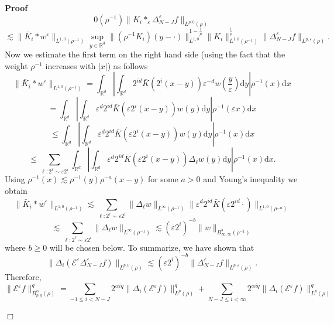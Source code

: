 \documentclass[a4paper,11pt]{article}
\newcommand{\cdummy}{\cdot}
\newcommand{\mathd}{\mathrm{d}}
\newenvironment{proof}{\noindent\textbf{Proof\ }}{\hspace*{\fill}$\Box$\medskip}
\numberwithin{equation}{section}
\begin{document}
\begin{proof}
\[{{     0} (\rho^{- 1})} \| K_i \ast_{\varepsilon} \Delta^{\varepsilon}_{N - J} f
     \|_{L^{p, 0} (\rho)} \]
  \[ \lesssim \| \bar{K}_i \ast w^{\varepsilon} \|_{L^{1, 0} (\rho^{- 1})}
     \sup_{y \in \mathbb{R}^d} \| (\rho^{- 1} K_i) (y - \cdummy) \|^{1 -
     \frac{1}{p}}_{L^{1, 0}} \| K_i \|^{\frac{1}{p}}_{L^{1, 0} (\rho^{- 1})}
     \| \Delta^{\varepsilon}_{N - J} f \|_{L^{p, \varepsilon} (\rho)} . \]
  Now we estimate the first term on the right hand side (using the fact that the weight $\rho^{-1}$  increases with $|x|$) as follows
  \[ \| \bar{K}_i \ast w^{\varepsilon} \|_{L^{1, 0} (\rho^{- 1})} =
     \int_{\mathbb{R}^d} \left| \int_{\mathbb{R}^d} 2^{i d} \bar{K} (2^i (x -
     y)) \varepsilon^{- d} w \left( \frac{y}{\varepsilon} \right) \mathd y
     \right| \rho^{- 1} (x) \mathd x \]
  \[ = \int_{\mathbb{R}^d} \left| \int_{\mathbb{R}^d} \varepsilon^d 2^{i d}
     \bar{K} (\varepsilon 2^i (x - y)) w (y) \mathd y \right| \rho^{- 1}
     (\varepsilon x) \mathd x \]
  \[ \leqslant \int_{\mathbb{R}^d} \left| \int_{\mathbb{R}^d} \varepsilon^d
     2^{i d} \bar{K} (\varepsilon 2^i (x - y)) w (y) \mathd y \right| \rho^{-
     1} (x) \mathd x \]
  \[ \leqslant \sum_{\ell : 2^{\ell} \sim \varepsilon 2^i} \int_{\mathbb{R}^d}
     \left| \int_{\mathbb{R}^d} \varepsilon^d 2^{i d} \bar{K} (\varepsilon 2^i
     (x - y)) \Delta_{\ell} w (y) \mathd y \right| \rho^{- 1} (x) \mathd x .\]
Using $\rho^{- 1} (x) \lesssim \rho^{- 1} (y) \rho^{- a} (x - y)$ for
  some $a > 0$ and  Young's inequality we obtain
  \[ \| \bar{K}_i \ast w^{\varepsilon} \|_{L^{1, 0} (\rho^{- 1})} \lesssim
     \sum_{\ell : 2^{\ell} \sim \varepsilon 2^i} \| \Delta_{\ell} w
     \|_{L^{\infty} (\rho^{- 1})} \| \varepsilon^d 2^{i d} \bar{K}
     (\varepsilon 2^{i d} \cdummy) \|_{L^{1, 0} (\rho^{- a})} \]
  \[ \lesssim \sum_{\ell : 2^{\ell} \sim \varepsilon 2^i} \| \Delta_{\ell} w
     \|_{L^{\infty} (\rho^{- 1})} \lesssim (\varepsilon 2^i)^{- b} \| w
     \|_{B^b_{\infty, \infty} (\rho^{- 1})} \]
  where $b \geqslant 0$ will be chosen below. To summarize, we have shown that
  \[ \| \Delta_i (\mathcal{E}^{\varepsilon} \Delta^{\varepsilon}_{N - J} f)
     \|_{L^{p, 0} (\rho)} \lesssim (\varepsilon 2^i)^{- b} \|
     \Delta^{\varepsilon}_{N - J} f \|_{L^{p, \varepsilon} (\rho)} . \]
  Therefore,
  \[ \| \mathcal{E}^{\varepsilon} f \|_{B^{\alpha}_{p, q} (\rho)}^q = \sum_{-
     1 \leqslant i < N - J} 2^{\alpha i q} \| \Delta_i
     (\mathcal{E}^{\varepsilon} f) \|^q_{L^p (\rho)} + \sum_{N - J \leqslant i
     < \infty} 2^{\alpha i q} \| \Delta_i (\mathcal{E}^{\varepsilon} f)
     \|^q_{L^p (\rho)} \]

\end{proof}
\end{document}
